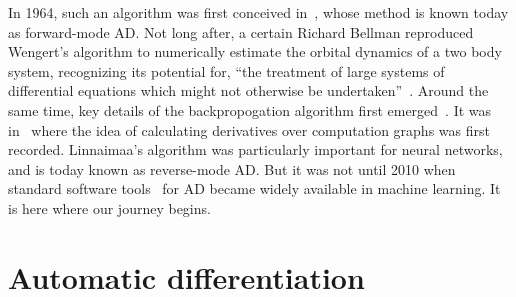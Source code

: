 \documentclass[12pt,initial,twoside,maitrise]{dms}
\numberwithin{equation}{section}
\numberwithin{table}{chapter}
\numberwithin{figure}{chapter}
\begin{document}
In 1964, such an algorithm was first conceived in~\citet{wengert1964simple}, whose method is known today as forward-mode AD. Not long after, a certain Richard Bellman reproduced Wengert's algorithm to numerically estimate the orbital dynamics of a two body system, recognizing its potential for, ``the treatment of large systems of differential equations which might not otherwise be undertaken''~\citep{bellman1965wengert}. Around the same time, key details of the backpropogation algorithm first emerged~\citep{dreyfus1990artificial}. It was in~\citet{linnainmaa1970representation} where the idea of calculating derivatives over computation graphs was first recorded. Linnaimaa's algorithm was particularly important for neural networks, and is today known as reverse-mode AD. But it was not until 2010 when standard software tools~\citep{bergstra2010theano} for AD became widely available in machine learning. It is here where our journey begins.

\section{Automatic differentiation}\label{sec:automatic-differentiation}
\end{document}
